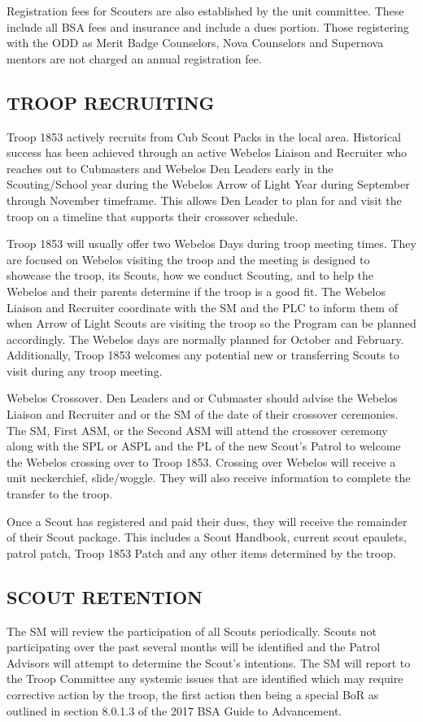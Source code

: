 \documentclass{ltxguide}
\begin{document}
Registration fees for Scouters are also established by the unit committee. These include all \ac{BSA} fees and insurance and include a dues portion. Those registering with the \ac{ODD} as Merit Badge Counselors, Nova Counselors and Supernova mentors are not charged an annual registration fee.

\subsection{TROOP RECRUITING}
Troop 1853 actively recruits from Cub Scout Packs in the local area. Historical success has been achieved through an active Webelos Liaison and Recruiter who reaches out to Cubmasters and Webelos Den Leaders early in the Scouting/School year during the Webelos Arrow of Light Year during September through November timeframe. This allows Den Leader to plan for and visit the troop on a timeline that supports their crossover schedule.

Troop 1853 will usually offer two Webelos Days during troop meeting times. They are focused on Webelos visiting the troop and the meeting is designed to showcase the troop, its Scouts, how we conduct Scouting, and to help the Webelos and their parents determine if the troop is a good fit. The Webelos Liaison and Recruiter coordinate with the \ac{SM} and the \ac{PLC} to inform  them of when Arrow of Light Scouts are visiting the troop so the Program can be planned accordingly. The Webelos days are normally planned for October and February. Additionally, Troop 1853 welcomes any potential new or transferring Scouts to visit during any troop meeting.

Webelos Crossover. Den Leaders and or Cubmaster should advise the Webelos Liaison and Recruiter and or the \ac{SM} of the date of their crossover ceremonies. The \ac{SM}, First \ac{ASM}, or the Second \ac{ASM} will attend the crossover ceremony along with the \ac{SPL} or \ac{ASPL} and the \ac{PL} of the new Scout's Patrol to welcome the Webelos crossing over to Troop 1853. Crossing over Webelos will receive a unit neckerchief, slide/woggle. They will also receive information to complete the transfer to the troop.

Once a Scout has registered and paid their dues, they will receive the remainder of their Scout package. This includes a Scout Handbook, current scout epaulets, patrol patch, Troop 1853 Patch and any other items determined by the troop.

\subsection{SCOUT RETENTION}
The \ac{SM} will review the participation of all Scouts periodically. Scouts not participating over the past several months will be identified and the Patrol Advisors will attempt to determine the Scout's intentions. The \ac{SM} will report to the Troop Committee any systemic issues that are identified which may require corrective action by the troop, the first action then being a special \ac{BoR} as outlined in section 8.0.1.3 of the 2017 \ac{BSA} Guide to Advancement.
\end{document}
